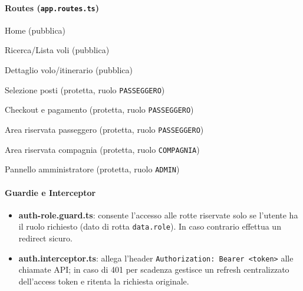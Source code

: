 \documentclass[12pt,a4paper]{article}
\begin{document}
\paragraph{Routes (\texttt{app.routes.ts})}
\begin{description}[style=unboxed,leftmargin=0cm]
	\item[/] Home (pubblica)
	\item[/voli] Ricerca/Lista voli (pubblica)
	\item[/dettagli] Dettaglio volo/itinerario (pubblica)
	\item[/posti] Selezione posti (protetta, ruolo \texttt{PASSEGGERO})
	\item[/checkout] Checkout e pagamento (protetta, ruolo \texttt{PASSEGGERO})
	\item[/passeggero] Area riservata passeggero (protetta, ruolo \texttt{PASSEGGERO})
	\item[/aerolinea] Area riservata compagnia (protetta, ruolo \texttt{COMPAGNIA})
	\item[/admin] Pannello amministratore (protetta, ruolo \texttt{ADMIN})
\end{description}

\paragraph{Guardie e Interceptor}
\begin{itemize}[noitemsep]
	\item \textbf{auth-role.guard.ts}: consente l'accesso alle rotte riservate solo se l'utente ha il ruolo richiesto (dato di rotta \texttt{data.role}). In caso contrario effettua un redirect sicuro.
	\item \textbf{auth.interceptor.ts}: allega l'header \texttt{Authorization: Bearer <token>} alle chiamate API; in caso di 401 per scadenza gestisce un refresh centralizzato dell'access token e ritenta la richiesta originale.
\end{itemize}
\end{document}
